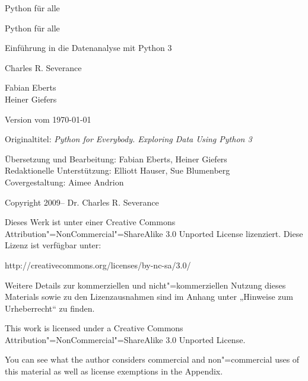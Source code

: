 
\begin{titlepage}
\begin{center}
\vspace*{15mm}

\sffamily
\LARGE
Python für alle

\end{center}
\end{titlepage}


\cleardoublepage
\thispagestyle{plain}

\begin{center}
\vspace*{15mm}

\sffamily
\LARGE
Python für alle

\large
Einführung in die Datenanalyse mit Python 3

\vspace{15mm}

\large
Charles R. Severance

\vspace{20mm}

\normalsize
Fabian Eberts\\
Heiner Giefers

\vspace{105mm}

\normalsize
Version vom \today

\end{center}

\normalsize
\normalfont


\clearpage
\thispagestyle{plain}

Originaltitel: \textit{Python for Everybody. Exploring Data Using Python 3}

Übersetzung und Bearbeitung: Fabian Eberts, Heiner Giefers\\
Redaktionelle Unterstützung: Elliott Hauser, Sue Blumenberg\\
Covergestaltung: Aimee Andrion

Copyright 2009--\the\year{} Dr. Charles R. Severance

Dieses Werk ist unter einer Creative Commons Attribution"=NonCommercial"=ShareAlike 3.0 Unported License lizenziert. Diese Lizenz ist verfügbar unter:

http://creativecommons.org/licenses/by-nc-sa/3.0/

Weitere Details zur kommerziellen und nicht"=kommerziellen Nutzung dieses Materials sowie zu den Lizenzausnahmen sind im Anhang unter „Hinweise zum Urheberrecht“ zu finden.

This work is licensed under a Creative Commons Attribution"=NonCommercial"=ShareAlike 3.0 Unported License.

You can see what the author considers commercial and non"=commercial uses of this material as well as license exemptions in the Appendix.
